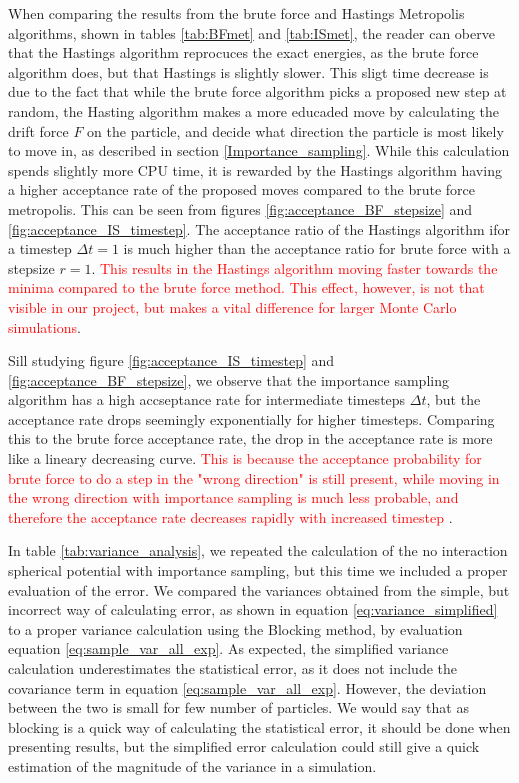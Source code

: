 \documentclass[norsk,a4paper,12pt]{article}
\begin{document}
When comparing the results from the brute force and Hastings Metropolis algorithms, shown in tables \ref{tab:BFmet} and \ref{tab:ISmet}, the reader can oberve that the Hastings algorithm reprocuces the exact energies, as the brute force algorithm does, but that Hastings is slightly slower. This sligt time decrease is due to the fact that while the brute force algorithm picks a proposed new step at random, the Hasting algorithm makes a more educaded move by calculating the drift force $F$ on the particle, and decide what direction the particle is most likely to move in, as described in section \ref{Importance_sampling}. While this calculation spends slightly more CPU time, it is rewarded by the Hastings algorithm having a higher acceptance rate of the proposed moves compared to the brute force metropolis. This can be seen from figures \ref{fig:acceptance_BF_stepsize} and \ref{fig:acceptance_IS_timestep}. The acceptance ratio of the Hastings algorithm ifor a timestep $\Delta t =1$ is much higher than the acceptance ratio for brute force with a stepsize $r=1$. \textcolor{red}{This results in the Hastings algorithm moving faster towards the minima compared to the brute force method. This effect, however, is not that visible in our project, but makes a vital difference for larger Monte Carlo simulations}.
\par 
\vspace{3mm}

Sill studying figure \ref{fig:acceptance_IS_timestep} and \ref{fig:acceptance_BF_stepsize}, we observe that the importance sampling algorithm has a high accseptance rate for intermediate timesteps $\Delta t$, but the acceptance rate drops seemingly exponentially for higher timesteps. Comparing this to the brute force acceptance rate, the drop in the acceptance rate is more like a lineary decreasing curve. \textcolor{red}{This is because the acceptance probability for brute force to do a step in the "wrong direction" is still present, while moving in the wrong direction with importance sampling is much less probable, and therefore the acceptance rate decreases rapidly with increased timestep }.
\par 
\vspace{3mm}

In table \ref{tab:variance_analysis}, we repeated the calculation of the no interaction spherical potential with importance sampling, but this time we included a proper evaluation of the error. We compared the variances obtained from the simple, but incorrect way of calculating error, as shown in equation \ref{eq:variance_simplified} to a proper variance calculation using the Blocking method, by evaluation equation \ref{eq:sample_var_all_exp}. As expected, the simplified variance calculation underestimates the statistical error, as it does not include the covariance term in equation \ref{eq:sample_var_all_exp}. However, the deviation between the two is small for few number of particles. We would say that as blocking is a quick way of calculating the statistical error, it should be done when presenting results, but the simplified error calculation could still give a quick estimation of the magnitude of the variance in a simulation.
\par 
\vspace{3mm}
\end{document}
